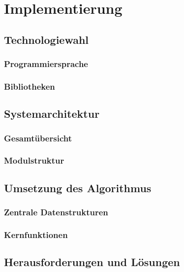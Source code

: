 \chapter{Implementierung} %
\label{chap:implementierung}

\section{Technologiewahl}

\subsection{Programmiersprache}

\subsection{Bibliotheken}

\section{Systemarchitektur}

\subsection{Gesamtübersicht}

\subsection{Modulstruktur}

\section{Umsetzung des Algorithmus}

\subsection{Zentrale Datenstrukturen}

\subsection{Kernfunktionen}

\section{Herausforderungen und Lösungen}